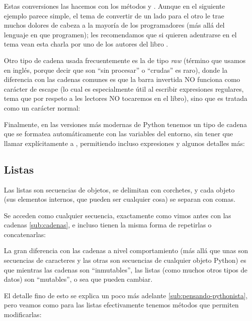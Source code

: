 Estas conversiones las hacemos con los métodos  y . Aunque en el siguiente ejemplo parece simple, el tema de convertir de un lado para el otro le trae muchos dolores de cabeza a la mayoría de los programadores (más allá del lenguaje en que programen); les recomendamos que si quieren adentrarse en el tema vean esta charla por uno de los autores del libro \cite{entendiendo_unicode}.


Otro tipo de cadena usada frecuentemente es la de tipo \textit{raw} (término que usamos en inglés, porque decir que son ``sin procesar'' o ``crudas'' es raro), donde la diferencia con las cadenas comunes es que la barra invertida NO funciona como carácter de escape (lo cual es especialmente útil al escribir expresiones regulares, tema que por respeto a les lectores NO tocaremos en el libro), sino que es tratada como un carácter normal:


Finalmente, en las versiones más modernas de Python tenemos un tipo de cadena que se formatea automáticamente con las variables del entorno, sin tener que llamar explícitamente a , permitiendo incluso expresiones y algunos detalles más:



\subsection{Listas}

Las listas son secuencias de objetos, se delimitan con corchetes, y cada objeto (sus elementos internos, que pueden ser cualquier cosa) se separan con comas.

Se acceden como cualquier secuencia, exactamente como vimos antes con las cadenas \ref{sub:cadenas}, e incluso tienen la misma forma de repetirlas o concatenarlas:


La gran diferencia con las cadenas a nivel comportamiento (más allá que unas son secuencias de caracteres y las otras son secuencias de cualquier objeto Python) es que mientras las cadenas son ``inmutables'', las listas (como muchos otros tipos de datos) son ``mutables'', o sea que pueden cambiar.

El detalle fino de esto se explica un poco más adelante \ref{sub:pensando-pythonista}, pero veamos como para las listas efectivamente tenemos métodos que permiten modificarlas:


